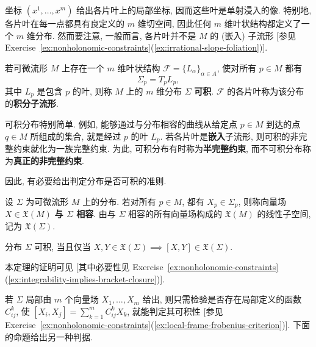 \begin{RiemannRemark}\label{rem:leaves-as-injective-immersions}
坐标 $(x^1,\ldots,x^m)$ 给出各片叶上的局部坐标, 因而这些叶是单射浸入的像. 特别地, 各片叶在每一点都具有良定义的 $m$ 维切空间, 因此任何 $m$ 维叶状结构都定义了一个 $m$ 维分布. 然而要注意, 一般而言, 各片叶并不是 $M$ 的 (嵌入) 子流形 [参见 Exercise~\ref{ex:nonholonomic-constraints}(\ref{ex:irrational-slope-foliation})].
\end{RiemannRemark}

\begin{RiemannDefinition}\label{def:integrable-distribution}
若可微流形 $M$ 上存在一个 $m$ 维叶状结构 $\mathcal{F}=\{L_\alpha\}_{\alpha\in A}$, 使对所有 $p\in M$ 都有
\[
  \Sigma_p=T_pL_p,
\]
其中 $L_p$ 是包含 $p$ 的叶, 则称 $M$ 上的 $m$ 维分布 $\Sigma$ \textbf{可积}. $\mathcal{F}$ 的各片叶称为该分布的\textbf{积分子流形}.
\end{RiemannDefinition}

可积分布特别简单. 例如, 能够通过与分布相容的曲线从给定点 $p\in M$ 到达的点 $q\in M$ 所组成的集合, 就是经过 $p$ 的叶 $L_p$. 若各片叶是\textbf{嵌入}子流形, 则可积的非完整约束就化为一族完整约束. 为此, 可积分布有时称为\textbf{半完整约束}, 而不可积分布称为\textbf{真正的非完整约束}.

因此, 有必要给出判定分布是否可积的准则.

\begin{RiemannDefinition}\label{def:vector-field-compatible-with-distribution}
设 $\Sigma$ 为可微流形 $M$ 上的分布. 若对所有 $p\in M$, 都有 $X_p\in\Sigma_p$, 则称向量场 $X\in\mathfrak{X}(M)$ \textbf{与 $\Sigma$ 相容}. 由与 $\Sigma$ 相容的所有向量场构成的 $\mathfrak{X}(M)$ 的线性子空间, 记为 $\mathfrak{X}(\Sigma)$.
\end{RiemannDefinition}

\begin{RiemannTheorem}[Frobenius]\label{thm:frobenius-integrability}
分布 $\Sigma$ 可积, 当且仅当 $X,Y\in\mathfrak{X}(\Sigma)\implies[X,Y]\in\mathfrak{X}(\Sigma)$.
\end{RiemannTheorem}

\begin{RiemannProof}
本定理的证明可见  [其中必要性见 Exercise~\ref{ex:nonholonomic-constraints}(\ref{ex:integrability-implies-bracket-closure})].
\end{RiemannProof}

若 $\Sigma$ 局部由 $m$ 个向量场 $X_1,\ldots,X_m$ 给出, 则只需检验是否存在局部定义的函数 $C_{ij}^k$, 使 $[X_i,X_j]=\sum_{k=1}^m C_{ij}^kX_k$, 就能判定其可积性 [参见 Exercise~\ref{ex:nonholonomic-constraints}(\ref{ex:local-frame-frobenius-criterion})]. 下面的命题给出另一种判据.

